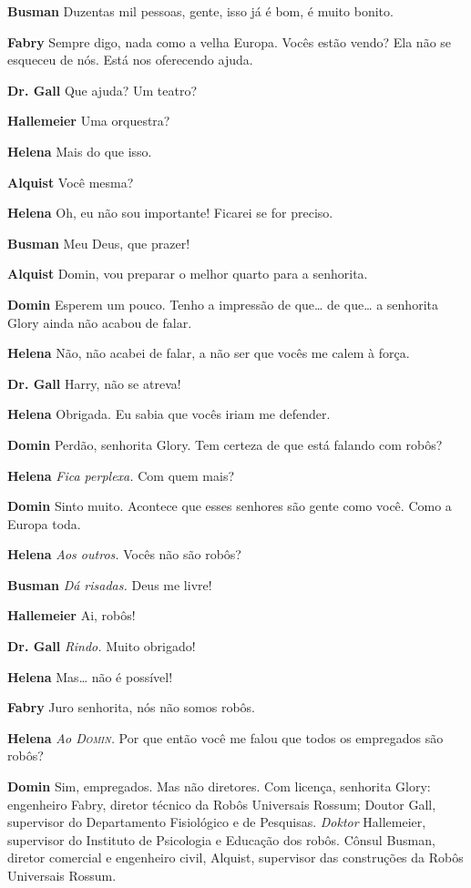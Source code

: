 \textbf{Busman} Duzentas mil pessoas, gente, isso já é
bom, é muito bonito.

\textbf{Fabry} Sempre digo, nada como a velha Europa. Vocês estão vendo? Ela não
se esqueceu de nós. Está nos oferecendo ajuda.

\textbf{Dr. Gall} Que ajuda? Um teatro?

\textbf{Hallemeier} Uma orquestra?

\textbf{Helena} Mais do que isso.

\textbf{Alquist} Você mesma?

\textbf{Helena} Oh, eu não sou importante! Ficarei se for preciso.

\textbf{Busman} Meu Deus, que prazer!

\textbf{Alquist} Domin, vou preparar o melhor quarto para a senhorita.

\textbf{Domin} Esperem um pouco. Tenho a impressão de que\ldots{} de que\ldots{} a senhorita Glory ainda
não acabou de falar.

\textbf{Helena} Não, não acabei de falar, a não ser que vocês me calem à força.


\textbf{Dr. Gall} Harry, não se atreva!

\textbf{Helena} Obrigada. Eu sabia que vocês iriam me defender.

\textbf{Domin} Perdão, senhorita Glory. Tem certeza de que está falando com robôs?

\textbf{Helena} \emph{Fica perplexa.} Com quem mais?

\textbf{Domin} Sinto muito. Acontece que esses senhores são gente como você. Como a
Europa toda.

\textbf{Helena} \emph{Aos outros.} Vocês não são robôs?

\textbf{Busman} \emph{Dá risadas.} Deus me livre!

\textbf{Hallemeier} Ai, robôs!

\textbf{Dr. Gall} \emph{Rindo.} Muito obrigado!

\textbf{Helena} Mas\ldots{} não é possível!

\textbf{Fabry} Juro senhorita, nós não somos robôs.

\textbf{Helena} \emph{Ao \textsc{Domin}.} Por que então você me falou que todos os empregados são robôs?

\textbf{Domin} Sim, empregados. Mas não diretores. Com licença, senhorita Glory:
engenheiro Fabry, diretor técnico da Robôs Universais Rossum;
 Doutor Gall, supervisor do Departamento Fisiológico e de Pesquisas.
\textit{Doktor} Hallemeier, supervisor do Instituto de Psicologia e Educação dos
 robôs. Cônsul Busman, diretor comercial e engenheiro civil, 
 Alquist, supervisor das construções da Robôs Universais Rossum.

